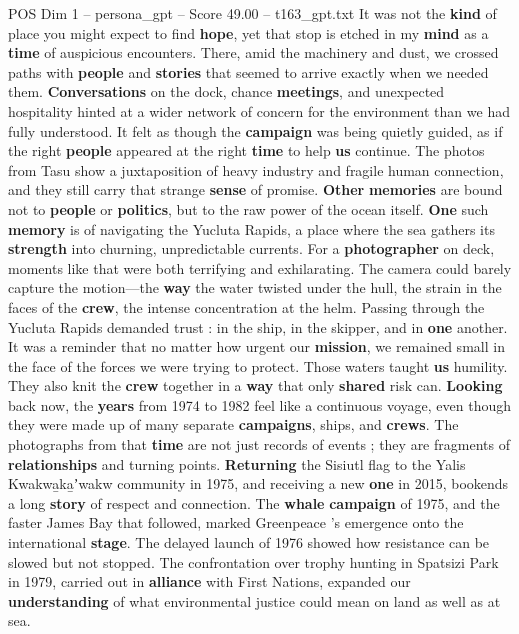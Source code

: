 \begin{textsample}{POS Dim 1 – persona\_gpt – Score 49.00 – t163\_gpt.txt}
It was not the \textbf{kind} of place you might expect to find \textbf{hope}, yet that stop is etched in my \textbf{mind} as a \textbf{time} of auspicious encounters.
There, amid the machinery and dust, we crossed paths with \textbf{people} and \textbf{stories} that seemed to arrive exactly when we needed them. \textbf{Conversations} on the dock, chance \textbf{meetings}, and unexpected hospitality hinted at a wider network of concern for the environment than we had fully understood.
It felt as though the \textbf{campaign} was being quietly guided, as if the right \textbf{people} appeared at the right \textbf{time} to help \textbf{us} continue.
The photos from Tasu show a juxtaposition of heavy industry and fragile human connection, and they still carry that strange \textbf{sense} of promise. \textbf{Other} \textbf{memories} are bound not to \textbf{people} or \textbf{politics}, but to the raw power of the ocean itself. \textbf{One} such \textbf{memory} is of navigating the Yucluta Rapids, a place where the sea gathers its \textbf{strength} into churning, unpredictable currents.
For a \textbf{photographer} on deck, moments like that were both terrifying and exhilarating.
The camera could barely capture the motion—the \textbf{way} the water twisted under the hull, the strain in the faces of the \textbf{crew}, the intense concentration at the helm.
Passing through the Yucluta Rapids demanded trust : in the ship, in the skipper, and in \textbf{one} another.
It was a reminder that no matter how urgent our \textbf{mission}, we remained small in the face of the forces we were trying to protect.
Those waters taught \textbf{us} humility.
They also knit the \textbf{crew} together in a \textbf{way} that only \textbf{shared} risk can. \textbf{Looking} back now, the \textbf{years} from 1974 to 1982 feel like a continuous voyage, even though they were made up of many separate \textbf{campaigns}, ships, and \textbf{crews}.
The photographs from that \textbf{time} are not just records of events ; they are fragments of \textbf{relationships} and turning points. \textbf{Returning} the Sisiutl flag to the Yalis Kwakwa̱ka̱ʼwakw community in 1975, and receiving a new \textbf{one} in 2015, bookends a long \textbf{story} of respect and connection.
The \textbf{whale} \textbf{campaign} of 1975, and the faster James Bay that followed, marked Greenpeace ’s emergence onto the international \textbf{stage}.
The delayed launch of 1976 showed how resistance can be slowed but not stopped.
The confrontation over trophy hunting in Spatsizi Park in 1979, carried out in \textbf{alliance} with First Nations, expanded our \textbf{understanding} of what environmental justice could mean on land as well as at sea.

\end{textsample}
